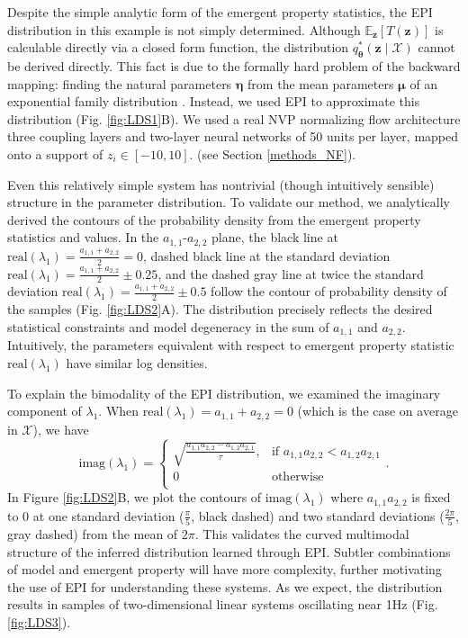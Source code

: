 \documentclass[11pt]{article}
\begin{document}
Despite the simple analytic form of the emergent property statistics, the EPI distribution in this example is not simply determined.
Although $\mathbb{E}_{\mathbf{z}}\left[T(\mathbf{z})\right]$ is calculable directly via a closed form function, the distribution $q^*_{\bm{\theta}}(\mathbf{z} \mid \mathcal{X})$ cannot be derived directly.  
This fact is due to the formally hard problem of the backward mapping: finding the natural parameters $\bm{\eta}$ from the mean parameters $\bm{\mu}$ of an exponential family distribution \cite{wainwright2008graphical}.  
Instead, we used EPI to approximate this distribution (Fig. \ref{fig:LDS1}B). 
We used a real NVP normalizing flow architecture three coupling layers and two-layer neural networks of 50 units per layer, mapped onto a support of $z_i \in \left[-10, 10 \right]$. (see Section \ref{methods_NF}).

Even this relatively simple system has nontrivial (though intuitively sensible) structure in the parameter distribution.  
To validate our method, we analytically derived the contours of the probability density from the emergent property statistics and values.
In the $a_{1,1}$-$a_{2,2}$ plane, the black line at $\text{real}(\lambda_1) = \frac{a_{1,1} + a_{2,2}}{2} = 0$, dashed black line at
the standard deviation $\text{real}(\lambda_1) = \frac{a_{1,1} + a_{2,2}}{2} \pm 0.25$, and the dashed gray line at twice the standard deviation
$\text{real}(\lambda_1) = \frac{a_{1,1} + a_{2,2}}{2} \pm 0.5$ follow the contour of probability density of the samples (Fig. \ref{fig:LDS2}A). 
The distribution precisely reflects the desired statistical constraints and model degeneracy in the sum of $a_{1,1}$ and $a_{2,2}$.
Intuitively, the parameters equivalent with respect to emergent property statistic $\text{real}(\lambda_1)$ have similar log densities.

To explain the bimodality of the EPI distribution, we examined the imaginary component of $\lambda_1$.  
When $\text{real}(\lambda_1) = a_{1,1} + a_{2,2} = 0$ (which is the case on average in $\mathcal{X}$), we have
\begin{equation}
\text{imag}(\lambda_1) = \begin{cases}
                             \sqrt{\frac{a_{1,1} a_{2,2} - a_{1,2} a_{2,1}}{\tau}},  & \text{if } a_{1,1} a_{2,2} < a_{1,2} a_{2,1} \\
                             0 & \text{otherwise } \\
                         \end{cases}.
\end{equation}
In Figure \ref{fig:LDS2}B, we plot the contours of $\text{imag}(\lambda_1)$ where $a_{1,1} a_{2,2}$ is fixed to 0 at one standard deviation ($\frac{\pi}{5}$, black dashed) and two standard deviations ($\frac{2\pi}{5}$, gray dashed) from the mean of $2 \pi$.
This validates the curved multimodal structure of the inferred distribution learned through EPI.  
Subtler combinations of model and emergent property will have more complexity, further motivating the use of EPI for understanding these systems.  
As we expect, the distribution results in samples of two-dimensional linear systems oscillating near 1Hz (Fig. \ref{fig:LDS3}).
\end{document}
